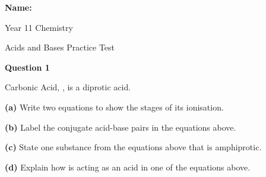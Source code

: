 \documentclass{article}
\begin{document}


{\Large \textbf{Name:}} \hspace{3cm} \vspace{1cm}


\begin{center}
{\Huge Year 11 Chemistry}
\end{center}

\begin{center}
{\huge Acids and Bases Practice Test}
\end{center}

{\Large

\vspace{0.2cm}
\hspace{1cm}
\textbf{Question 1} 
\vspace{0.2cm}

Carbonic Acid, , is a diprotic acid.
\vspace{0.2cm}

\textbf{(a)} Write two equations to show the stages of its ionisation.

\begin{center}
  \ce{}


\textbf{(b)} Label the conjugate acid-base pairs in the equations above.
\vspace{0.2cm}

\textbf{(c)} State one substance from the equations above that is amphiprotic.

\vspace{0.8cm}
\begin{center}
\end{center}
\vspace{0.2cm}

\textbf{(d)} Explain how  is acting as an acid in one of the equations above.

\vspace{0.8cm}
\begin{center}
\end{center}
\vspace{0.2cm}




\end{center}}
\end{document}
